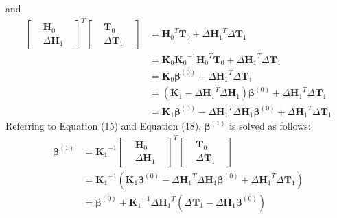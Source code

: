 \documentclass[a4paper, 14pt]{extarticle}
\begin{document}
\newline
and
\newline
\begin{equation}
    \begin{split}
      \begin{bmatrix}
    &\mathbf{H}_0&\\
    &\Delta\mathbf{H}_1&
    \end{bmatrix}^T
    \begin{bmatrix}
    &\mathbf{T}_0&\\
    &\Delta\mathbf{T}_1&
    \end{bmatrix}
    &={\mathbf{H}_0}^T\mathbf{T}_0+{\Delta\mathbf{H}_1}^T\Delta\mathbf{T}_1 
    \\&=\mathbf{K}_0{\mathbf{K}_0}^{-1}{\mathbf{H}_0}^T\mathbf{T}_0+{\Delta\mathbf{H}_1}^T\Delta\mathbf{T}_1
    \\&=\mathbf{K}_0\mathbf{\beta}^{(0)}+{
    \Delta\mathbf{H}_1}^T\Delta\mathbf{T}_1
    \\&=(\mathbf{K}_1-{\Delta\mathbf{H}_1}^T\Delta\mathbf{H}_1){\mathbf{\beta}}^{(0)}+{\Delta\mathbf{H}_1}^T\Delta\mathbf{T}_1
    \\&=\mathbf{K}_1\mathbf{\beta}^{(0)}-{\Delta\mathbf{H}_1}^T\Delta\mathbf{H}_1{\mathbf{\beta}}^{(0)}+{\Delta\mathbf{H}_1}^T\Delta\mathbf{T}_1
    \end{split}
\end{equation}
\newline
Referring to Equation (15) and Equation (18), \(\mathbf{\beta}^{(1)}\) is solved as follows:
\begin{equation}
    \begin{split}
       \mathbf{\beta}^{(1)}
    &={\mathbf{K}_1}^{-1}
    \begin{bmatrix}
    &\mathbf{H}_0&\\
    &\Delta\mathbf{H}_1&
    \end{bmatrix}^T
    \begin{bmatrix}
    &\mathbf{T}_0&\\
    &\Delta\mathbf{T}_1&
    \end{bmatrix}  
    \\&={\mathbf{K}_1}^{-1}(\mathbf{K}_1\mathbf{\beta}^{(0)}-{\Delta\mathbf{H}_1}^T\Delta\mathbf{H}_1{\mathbf{\beta}}^{(0)}+{\Delta\mathbf{H}_1}^T\Delta\mathbf{T}_1)
    \\&=\mathbf{\beta}^{(0)}+{\mathbf{K}_1}^{-1}{\Delta\mathbf{H}_1}^T(\Delta\mathbf{T}_1-\Delta\mathbf{H}_1{\mathbf{\beta}}^{(0)})
    \end{split}
\end{equation}
\end{document}
